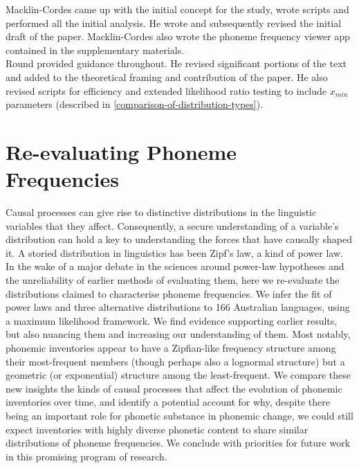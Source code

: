 \noindent
Macklin-Cordes came up with the initial concept for the study, wrote scripts and performed all the initial analysis. He wrote and subsequently revised the initial draft of the paper. Macklin-Cordes also wrote the phoneme frequency viewer app contained in the supplementary materials.\\

\noindent
Round provided guidance throughout. He revised significant portions of the text and added to the theoretical framing and contribution of the paper. He also revised scripts for efficiency and extended likelihood ratio testing to include $x_{min}$ parameters (described in \ref{comparison-of-distribution-types}).


\chapter[Re-evaluating phoneme frequencies]{Re-evaluating Phoneme Frequencies}
\label{Chap:phon-freqs}	%
\pagestyle{headings}

Causal processes can give rise to distinctive distributions in the linguistic variables that they affect. Consequently, a secure understanding of a variable's distribution can hold a key to understanding the forces that have causally shaped it. A storied distribution in linguistics has been Zipf's law, a kind of power law. In the wake of a major debate in the sciences around power-law hypotheses and the unreliability of earlier methods of evaluating them, here we re-evaluate the distributions claimed to characterise phoneme frequencies. We infer the fit of power laws and three alternative distributions to 166 Australian languages, using a maximum likelihood framework. We find evidence supporting earlier results, but also nuancing them and increasing our understanding of them. Most notably, phonemic inventories appear to have a Zipfian-like frequency structure among their most-frequent members (though perhaps also a lognormal structure) but a geometric (or exponential) structure among the least-frequent. We compare these new insights the kinds of causal processes that affect the evolution of phonemic inventories over time, and identify a potential account for why, despite there being an important role for phonetic substance in phonemic change, we could still expect inventories with highly diverse phonetic content to share similar distributions of phoneme frequencies. We conclude with priorities for future work in this promising program of research.

